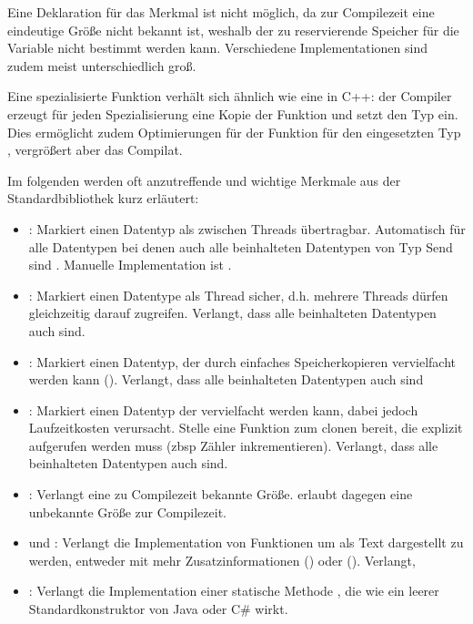 Eine Deklaration  für das Merkmal  ist nicht möglich, da zur Compilezeit eine eindeutige Größe nicht bekannt ist, weshalb der zu reservierende Speicher für die Variable nicht bestimmt werden kann.
Verschiedene Implementationen sind zudem meist unterschiedlich groß.

Eine spezialisierte Funktion verhält sich ähnlich wie eine  in C++: der Compiler erzeugt für jeden Spezialisierung eine Kopie der Funktion und setzt den Typ ein.
Dies ermöglicht zudem Optimierungen für der Funktion für den eingesetzten Typ , vergrößert aber das Compilat.

Im folgenden werden oft anzutreffende und wichtige Merkmale aus der Standardbibliothek kurz erläutert:
\begin{itemize}
	\item {}: Markiert einen Datentyp als zwischen Threads übertragbar. Automatisch für alle Datentypen bei denen auch alle beinhalteten Datentypen von Typ Send sind . Manuelle Implementation ist .
	\item {}: Markiert einen Datentype als Thread sicher, d.h. mehrere Threads dürfen gleichzeitig darauf zugreifen.  Verlangt, dass alle beinhalteten Datentypen auch  sind.
	\item {}: Markiert einen Datentyp, der durch einfaches Speicherkopieren  vervielfacht werden kann (). Verlangt, dass alle beinhalteten Datentypen auch  sind
	\item {}: Markiert einen Datentyp der vervielfacht werden kann, dabei jedoch Laufzeitkosten verursacht. Stelle eine Funktion zum clonen bereit, die explizit aufgerufen werden muss (zbsp Zähler inkrementieren). Verlangt, dass alle beinhalteten Datentypen auch  sind.
	\item {}: Verlangt eine zu Compilezeit bekannte Größe.  erlaubt dagegen eine unbekannte Größe zur Compilezeit.
	\item {} und : Verlangt die Implementation von Funktionen um als Text dargestellt zu werden, entweder mit mehr Zusatzinformationen () oder  (). Verlangt, 
	\item {}: Verlangt die Implementation einer statische Methode , die wie ein leerer Standardkonstruktor von Java oder C\# wirkt.

\end{itemize}
